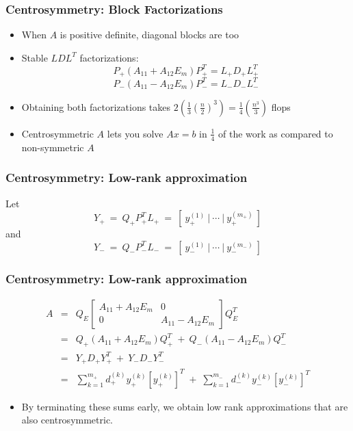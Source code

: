 \documentclass[bigger]{beamer}
\begin{document}
\begin{frame}
\frametitle{Centrosymmetry: Block Factorizations}
\label{sec-1-12}
\begin{itemize}

\item When $A$ is positive definite, diagonal blocks are too
\label{sec-1-12-1}%

\item Stable $LDL^{T}$ factorizations:\\
\label{sec-1-12-2}%
\[P_{+}(A_{11}+A_{12}E_{m})P_{+}^{T}  =  L_{+}D_{+}L_{+}^{T}\]\[P_{-}(A_{11}-A_{12}E_{m})P_{-}^{T}  =  L_{-}D_{-}L_{-}^{T}\]


\item Obtaining both factorizations takes $2(\frac{1}{3}(\frac{n}{2})^3)=\frac{1}{4}(\frac{n^3}{3})$ flops
\label{sec-1-12-3}%

\item Centrosymmetric $A$ lets you solve $Ax=b$ in $\frac{1}{4}$ of the work as compared to non-symmetric $A$
\label{sec-1-12-4}%
\end{itemize} %
\end{frame}
\begin{frame}
\frametitle{Centrosymmetry: Low-rank approximation}
\label{sec-1-13}

Let
\[
Y_{+} \:=\: Q_{+}P_{+}^{T}L_{+} \:=\: [ \:y^{(1)}_{+} \:| \: \cdots \:|\:y_{+}^{(m_+)} \:]
\]
and
\[
Y_{-} \:=\: Q_{-}P_{-}^{T}L_{-} \:=\: [ \:y^{(1)}_{-} \:| \: \cdots \:|\:y_{-}^{(m_-)} \:]
\]
\end{frame}
\begin{frame}
\frametitle{Centrosymmetry: Low-rank approximation}
\label{sec-1-14}

\begin{eqnarray*}
A&=& Q_{E} \left[ \begin{array}{cc} A_{11} + A_{12}E_{m} & 0 \\ 0 & A_{11}-A_{12}E_{m} \end{array} \right] Q_{E}^{T}\\
&=&  Q_{+}(A_{11}+A_{12}E_{m}) Q_{+}^{T} \:+\: Q_{-}(A_{11}-A_{12}E_{m}) Q_{-}^{T}\\
&=& Y_{+}D_{+} Y_{+}^{T} \:+\: Y_{-}D_{-} Y_{-}^{T}\\
&=& \sum_{k=1}^{m_{+}} d_{+}^{(k)} y_{+}^{(k)}[y_{+}^{(k)}]^{T} \;+\;
    \sum_{k=1}^{m_{-}} d_{-}^{(k)} y_{-}^{(k)}[y_{-}^{(k)}]^{T}
\end{eqnarray*}
\begin{itemize}

\item By terminating these sums early, we obtain low rank approximations that are also centrosymmetric.
\label{sec-1-14-1}%
\end{itemize} %
\end{frame}
\end{document}
